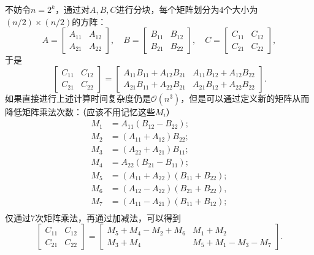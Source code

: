 \documentclass[12pt, a4paper, oneside]{ctexart}
\numberwithin{equation}{section}  %
\theoremstyle{definition}
\def\C{\mathbb{C}}          %
\def\O{\mathcal{O}}         %
\begin{document}
不妨令$n=2^k$，通过对$A,B,C$进行分块，每个矩阵划分为$4$个大小为$(n/2)\times (n/2)$的方阵：
\begin{equation*}
A={\begin{bmatrix}A_{11}&A_{12}\\A_{21}&A_{22}\end{bmatrix}},\quad 
B={\begin{bmatrix}B_{11}&B_{12}\\B_{21}&B_{22}\end{bmatrix}},\quad 
C={\begin{bmatrix}C_{11}&C_{12}\\C_{21}&C_{22}\end{bmatrix}},
\end{equation*}
于是
\begin{equation*}
{\begin{bmatrix}C_{11}&C_{12}\\C_{21}&C_{22}\end{bmatrix}}=
{\begin{bmatrix}
    A_{11}B_{11}+A_{12}B_{21}&A_{11}B_{12}+A_{12}B_{22}\\
    A_{21}B_{11}+A_{22}B_{21}&A_{21}B_{12}+A_{22}B_{22}
\end{bmatrix}}.
\end{equation*}
如果直接进行上述计算时间复杂度仍是$\O(n^3)$，但是可以通过定义新的矩阵从而降低矩阵乘法次数：（应该不用记忆这些$M_i$）
\begin{equation*}
{\begin{aligned}
    M_{1}&=A_{11}(B_{12}-B_{22});\\
    M_{2}&=(A_{11}+A_{12})B_{22};\\
    M_{3}&=(A_{22}+A_{21})B_{11};\\
    M_{4}&=A_{22}(B_{21}-B_{11});\\
    M_{5}&=(A_{11}+A_{22})(B_{11}+B_{22});\\
    M_{6}&=(A_{12}-A_{22})(B_{21}+B_{22}),\\
    M_{7}&=(A_{11}-A_{21})(B_{11}+B_{12});\\
\end{aligned}}
\end{equation*}
仅通过$7$次矩阵乘法，再通过加减法，可以得到
\begin{equation*}
{\begin{bmatrix}
    C_{11}&C_{12}\\
    C_{21}&C_{22}
\end{bmatrix}}=
{\begin{bmatrix}
    M_{5}+M_{4}-M_{2}+M_{6}&M_{1}+M_{2}\\
    M_{3}+M_{4}&M_{5}+M_{1}-M_{3}-M_{7}
\end{bmatrix}}.
\end{equation*}
\end{document}
